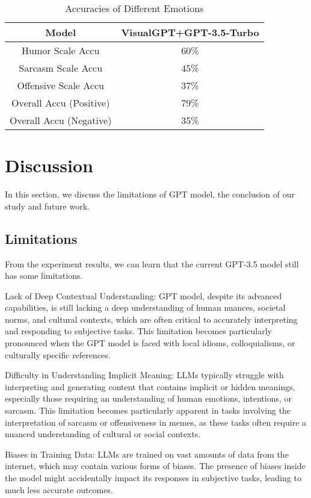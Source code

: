 \documentclass[conference]{IEEEtran}
\begin{document}
\begin{table}[htbp]
  \caption{Accuracies of Different Emotions}
  \label{tab:model-accuracy}
  \centering
  \begin{tabular}{|c|c|}
    \hline
    Model & \multicolumn{1}{|c|}{VisualGPT+GPT-3.5-Turbo} \\
    \hline
    Humor Scale Accu & 60\% \\
    \hline
    Sarcasm Scale Accu & 45\% \\
    \hline
    Offensive Scale Accu & 37\% \\
    \hline
    Overall Accu (Positive) & 79\% \\
    \hline
    Overall Accu (Negative) & 35\% \\
    \hline
  \end{tabular}
\end{table}


\section{Discussion}
In this section, we discuss the limitations of GPT model, the conclusion of our study and future work.

\subsection{Limitations}
From the experiment results, we can learn that the current GPT-3.5 model still has some limitations.

Lack of Deep Contextual Understanding: GPT model, despite its advanced capabilities, is still lacking a deep understanding of human nuances, societal norms, and cultural contexts, which are often critical to accurately interpreting and responding to subjective tasks. This limitation becomes particularly pronounced when the GPT model is faced with local idioms, colloquialisms, or culturally specific references.

Difficulty in Understanding Implicit Meaning: LLMs typically struggle with interpreting and generating content that contains implicit or hidden meanings, especially those requiring an understanding of human emotions, intentions, or sarcasm. This limitation becomes particularly apparent in tasks involving the interpretation of sarcasm or offensiveness in memes, as these tasks often require a nuanced understanding of cultural or social contexts.

Biases in Training Data: LLMs are trained on vast amounts of data from the internet, which may contain various forms of biases. The presence of biases inside the model might accidentally impact its responses in subjective tasks, leading to much less accurate outcomes. 
\end{document}
